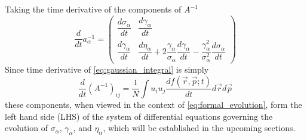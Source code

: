 Taking the time derivative of the components of $A^{-1}$
\begin{equation} \label{eq:dainvdt}
  \frac{d}{dt} a^{-1}_{\alpha} = 
  \begin{pmatrix}
    \dfrac{d\sigma_{\alpha}}{dt} & \dfrac{d\gamma_{\alpha}}{dt} \\
    \dfrac{d\gamma_{\alpha}}{dt} & \dfrac{d\eta_{\alpha}}{dt} + 2\dfrac{\gamma_{\alpha}}{\sigma_{\alpha}}\dfrac{d\gamma_{\alpha}}{dt}- \dfrac{\gamma^{2}_{\alpha}}{\sigma^{2}_{\alpha}}\dfrac{d\sigma_{\alpha}}{dt}
  \end{pmatrix}
\end{equation}
Since time derivative of \ref{eq:gaussian_integral} is simply
\begin{equation} \label{eq:gaussian_integral}
  \frac{d}{dt}(A^{-1})_{ij} = \frac{1}{N} \int u_i u_j \frac{df(\vec{r}, \vec{p}; t)}{dt} d\vec{r} d\vec{p}
\end{equation}
these components, when viewed in the context of \ref{eq:formal_evolution}, form the left hand side (LHS) of the system of differential equations governing the evolution of $\sigma_{\alpha}$, $\gamma_{\alpha}$, and $\eta_{\alpha}$, which will be established in the upcoming sections.

